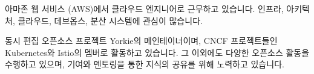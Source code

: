 

\begin{cvparagraph}

아마존 웹 서비스 (AWS)에서 클라우드 엔지니어로 근무하고 있습니다. 인프라, 아키텍처, 클라우드, 데브옵스, 분산 시스템에 관심이 많습니다.

동시 편집 오픈소스 프로젝트 Yorkie의 메인테이너이며, CNCF 프로젝트들인 Kubernetes와 Istio의 멤버로 활동하고 있습니다. 그 이외에도 다양한 오픈소스 활동을 수행하고 있으며, 기여와 멘토링을 통한 지식의 공유를 위해 노력하고 있습니다.
\end{cvparagraph}
